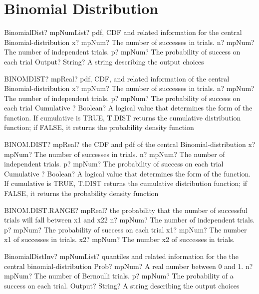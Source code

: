 \documentclass[12pt,a4paper,openany]{book}
\begin{document}
\section{Binomial Distribution}

\begin{mpFunctionsExtract}
\mpFunctionFourNotImplemented
{BinomialDist? mpNumList? pdf, CDF and related information for the central Binomial-distribution}
{x? mpNum? The number of successes in trials.}
{n? mpNum? The number of independent trials.}
{p? mpNum? The probability of success on each trial}
{Output? String? A string describing the output choices}
\end{mpFunctionsExtract}

\begin{mpFunctionsExtract}
\mpWorksheetFunctionFourNotImplemented
{BINOMDIST? mpReal? pdf, CDF, and related information of the central Binomial-distribution}
{x? mpNum? The number of successes in trials.}
{n? mpNum? The number of independent trials.}
{p? mpNum? The probability of success on each trial}
{Cumulative ? Boolean? A logical value that determines the form of the function. If cumulative is TRUE, T.DIST returns the cumulative distribution function; if FALSE, it returns the probability density function}
\end{mpFunctionsExtract}

\begin{mpFunctionsExtract}
\mpWorksheetFunctionFourNotImplemented
{BINOM.DIST? mpReal? the CDF and pdf of the central Binomial-distribution}
{x? mpNum? The number of successes in trials.}
{n? mpNum? The number of independent trials.}
{p? mpNum? The probability of success on each trial}
{Cumulative ? Boolean? A logical value that determines the form of the function. If cumulative is TRUE, T.DIST returns the cumulative distribution function; if FALSE, it returns the probability density function}
\end{mpFunctionsExtract}

\begin{mpFunctionsExtract}
\mpWorksheetFunctionFourNotImplemented
{BINOM.DIST.RANGE? mpReal?  the probability that the number of successful trials will fall between x1 and x22}
{n? mpNum? The number of independent trials.}
{p? mpNum? The probability of success on each trial}
{x1? mpNum? The number x1 of successes in trials.}
{x2? mpNum? The number x2 of successes in trials.}
\end{mpFunctionsExtract}

\begin{mpFunctionsExtract}
\mpFunctionFourNotImplemented
{BinomialDistInv? mpNumList? quantiles and related information for the the central binomial-distribution}
{Prob? mpNum? A real number between 0 and 1.}
{n? mpNum? The number of Bernoulli trials.}
{p? mpNum? The probability of a success on each trial.}
{Output? String? A string describing the output choices}
\end{mpFunctionsExtract}
\end{document}

